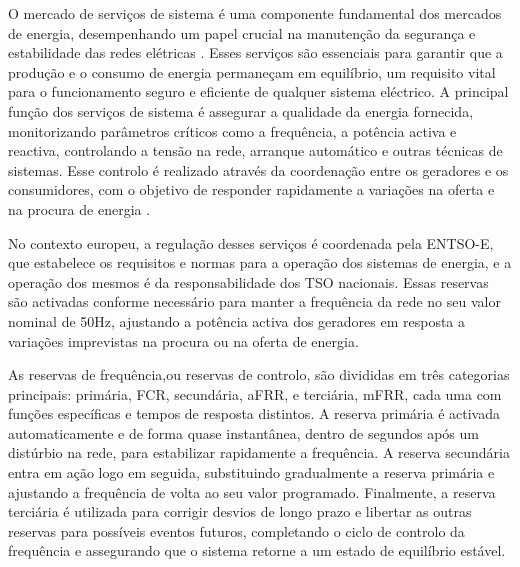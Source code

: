 
O mercado de serviços de sistema é uma componente fundamental dos mercados de energia, desempenhando um papel crucial na manutenção da segurança e estabilidade das redes elétricas \cite{dgegmss}. Esses serviços são essenciais para garantir que a produção e o consumo de energia permaneçam em equilíbrio, um requisito vital para o funcionamento seguro e eficiente de qualquer sistema eléctrico. A principal função dos serviços de sistema é assegurar a qualidade da energia fornecida, monitorizando parâmetros críticos como a frequência, a potência activa e reactiva, controlando a tensão na rede, arranque automático e outras técnicas de sistemas. Esse controlo é realizado através da coordenação entre os geradores e os consumidores, com o objetivo de responder rapidamente a variações na oferta e na procura de energia \cite{Rassid2017} \cite{Carneiro2016}.\par
No contexto europeu, a regulação desses serviços é coordenada pela \gls{ENTSO-E}, que estabelece os requisitos e normas para a operação dos sistemas de energia, e a operação dos mesmos é da responsabilidade dos \gls{TSO} nacionais. Essas reservas são activadas conforme necessário para manter a frequência da rede no seu valor nominal de 50Hz, ajustando a potência activa dos geradores em resposta a variações imprevistas na procura ou na oferta de energia.\par
As reservas de frequência,ou reservas de controlo, são divididas em três categorias principais: primária, \gls{FCR}, secundária, \gls{aFRR}, e terciária, \gls{mFRR}, cada uma com funções específicas e tempos de resposta distintos. A reserva primária é activada automaticamente e de forma quase instantânea, dentro de segundos após um distúrbio na rede, para estabilizar rapidamente a frequência. A reserva secundária entra em ação logo em seguida, substituindo gradualmente a reserva primária e ajustando a frequência de volta ao seu valor programado. Finalmente, a reserva terciária é utilizada para corrigir desvios de longo prazo e libertar as outras reservas para possíveis eventos futuros, completando o ciclo de controlo da frequência e assegurando que o sistema retorne a um estado de equilíbrio estável.\par
